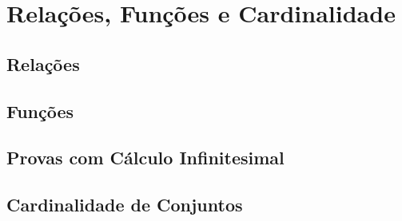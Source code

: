 \documentclass[a4paper,11pt]{book}
\theoremstyle{definition}
\theoremstyle{break}
\begin{document}
\part{Relações, Funções e Cardinalidade}

\chapter{Relações}

\chapter{Funções}

\chapter{Provas com Cálculo Infinitesimal}

\chapter{Cardinalidade de Conjuntos}
\end{document}

